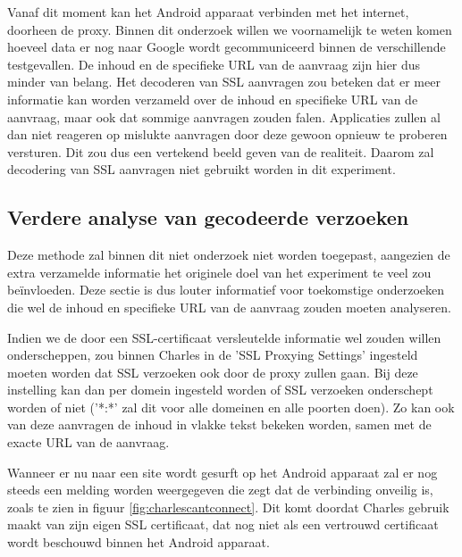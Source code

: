 Vanaf dit moment kan het Android apparaat verbinden met het internet, doorheen de proxy. Binnen dit onderzoek willen we voornamelijk te weten komen hoeveel data er nog naar Google wordt gecommuniceerd binnen de verschillende testgevallen. De inhoud en de specifieke URL van de aanvraag zijn hier dus minder van belang. Het decoderen van SSL aanvragen zou beteken dat er meer informatie kan worden verzameld over de inhoud en specifieke URL van de aanvraag, maar ook dat sommige aanvragen zouden falen. Applicaties zullen al dan niet reageren op mislukte aanvragen door deze gewoon opnieuw te proberen versturen. Dit zou dus een vertekend beeld geven van de realiteit. Daarom zal decodering van SSL aanvragen niet gebruikt worden in dit experiment. 

\subsection{Verdere analyse van gecodeerde verzoeken}
Deze methode zal binnen dit niet onderzoek niet worden toegepast, aangezien de extra verzamelde informatie het originele doel van het experiment te veel zou beïnvloeden. Deze sectie is dus louter informatief voor toekomstige onderzoeken die wel de inhoud en specifieke URL van de aanvraag zouden moeten analyseren.

Indien we de door een SSL-certificaat versleutelde informatie wel zouden willen onderscheppen, zou binnen Charles in de 'SSL Proxying Settings' ingesteld moeten worden dat SSL verzoeken ook door de proxy zullen gaan. Bij deze instelling kan dan per domein ingesteld worden of SSL verzoeken onderschept worden of niet ('*:*' zal dit voor alle domeinen en alle poorten doen). Zo kan ook van deze aanvragen de inhoud in vlakke tekst bekeken worden, samen met de exacte URL van de aanvraag. 

Wanneer er nu naar een site wordt gesurft op het Android apparaat zal er nog steeds een melding worden weergegeven die zegt dat de verbinding onveilig is, zoals te zien in figuur \ref{fig:charlescantconnect}. Dit komt doordat Charles gebruik maakt van zijn eigen SSL certificaat, dat nog niet als een vertrouwd certificaat wordt beschouwd binnen het Android apparaat.

